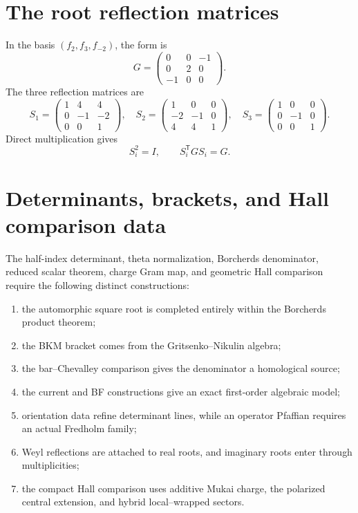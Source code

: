 \chapter{The root reflection matrices}
In the basis $(f_2,f_3,f_{-2})$, the form is
\[
 G=\begin{pmatrix}0&0&-1\\0&2&0\\-1&0&0\end{pmatrix}.
\]
The three reflection matrices are
\[
 S_1=\begin{pmatrix}1&4&4\\0&-1&-2\\0&0&1\end{pmatrix},\quad
 S_2=\begin{pmatrix}1&0&0\\-2&-1&0\\4&4&1\end{pmatrix},\quad
 S_3=\begin{pmatrix}1&0&0\\0&-1&0\\0&0&1\end{pmatrix}.
\]
Direct multiplication gives
\[
 S_i^2=I,
 \qquad S_i^{\mathsf T}GS_i=G.
\]

\chapter{Determinants, brackets, and Hall comparison data}
The half-index determinant, theta normalization, Borcherds denominator, reduced scalar theorem, charge Gram map, and geometric Hall comparison require the following distinct constructions:
\begin{enumerate}
\item the automorphic square root is completed entirely within the Borcherds product theorem;
\item the BKM bracket comes from the Gritsenko--Nikulin algebra;
\item the bar--Chevalley comparison gives the denominator a homological source;
\item the current and BF constructions give an exact first-order algebraic model;
\item orientation data refine determinant lines, while an operator Pfaffian requires an actual Fredholm family;
\item Weyl reflections are attached to real roots, and imaginary roots enter through multiplicities;
\item the compact Hall comparison uses additive Mukai charge, the polarized central extension, and hybrid local--wrapped sectors.
\end{enumerate}
